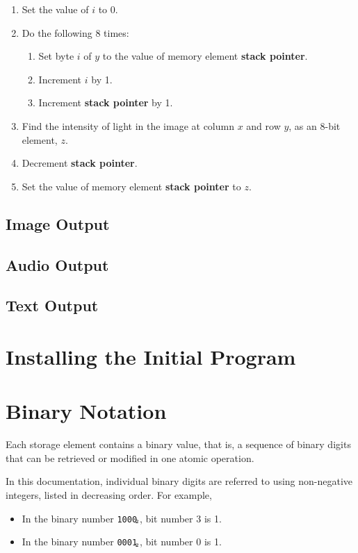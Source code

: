 \documentclass[a4paper,11pt]{article}
\newcommand{\SP}{\textbf{stack pointer}\xspace}
\newcommand{\num}[1]{\texttt{#1}\xspace}
\newcommand{\bin}[1]{\num{#1}$_{\textup{\tiny\hskip-1ex 2}}$\xspace}
\begin{document}
\begin{enumerate}
\begin{itemize}
\begin{enumerate}
    \item Set the value of $i$ to 0.
    \item Do the following 8 times:
      \begin{enumerate}
      \item Set byte $i$ of $y$ to the value of memory element \SP.
      \item Increment $i$ by 1.
      \item Increment \SP by 1.
      \end{enumerate}
    \item Find the intensity of light in the image at column $x$ and row $y$, as an 8-bit element, $z$.
    \item Decrement \SP.
    \item Set the value of memory element \SP to $z$.
    \end{enumerate}
  \end{itemize}
\end{enumerate}

\subsection{Image Output}

\subsection{Audio Output}

\subsection{Text Output}

\section{Installing the Initial Program}

\appendix

\section{Binary Notation}
\label{sec:binary-notation}

Each storage element contains a binary value, that is, a sequence of binary digits that can be retrieved or modified in one atomic operation.

In this documentation, individual binary digits are referred to using non-negative integers, listed in decreasing order.  For example,
\begin{itemize}
\item In the binary number \bin{1000}, bit number 3 is 1.
\item In the binary number \bin{0001}, bit number 0 is 1.
\end{itemize}
\end{document}

